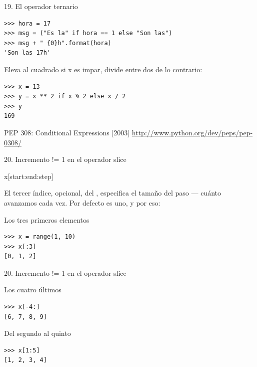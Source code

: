\documentclass[14pt]{beamer}
\begin{document}
\begin{frame}[fragile]{19. El operador ternario}
  \footnotesize
  \begin{exampleblock}{}
    \begin{lstlisting}
>>> hora = 17
>>> msg = ("Es la" if hora == 1 else "Son las")
>>> msg + " {0}h".format(hora)
'Son las 17h'
    \end{lstlisting}
  \end{exampleblock}

  \begin{exampleblock}
    {Eleva al cuadrado si x es impar, divide entre dos de lo contrario:}
    \begin{lstlisting}
>>> x = 13
>>> y = x ** 2 if x % 2 else x / 2
>>> y
169
    \end{lstlisting}
  \end{exampleblock}

  \small
  \begin{block}
    {\centering PEP 308: Conditional Expressions [2003]}
    \centering \url{http://www.python.org/dev/peps/pep-0308/}
  \end{block}
\end{frame}

\begin{frame}[fragile]{20. Incremento != 1 en el operador slice}
  \begin{block}{}
    \centering \LARGE x[start:end:step]
  \end{block}

  \small
  \begin{center}
    El tercer índice, opcional, del ,
    especifica el tamaño del paso --- cuánto avanzamos cada vez.
    Por defecto es uno, y por eso:
  \end{center}

  \begin{exampleblock}
    {Los tres primeros elementos}
    \begin{lstlisting}
>>> x = range(1, 10)
>>> x[:3]
[0, 1, 2]
    \end{lstlisting}
  \end{exampleblock}
\end{frame}

\begin{frame}[fragile]{20. Incremento != 1 en el operador slice}
  \begin{exampleblock}
    {Los cuatro últimos}
    \begin{lstlisting}
>>> x[-4:]
[6, 7, 8, 9]
    \end{lstlisting}
  \end{exampleblock}

  \begin{exampleblock}
    {Del segundo al quinto}
    \begin{lstlisting}
>>> x[1:5]
[1, 2, 3, 4]
    \end{lstlisting}
  \end{exampleblock}
\end{frame}
\end{document}
